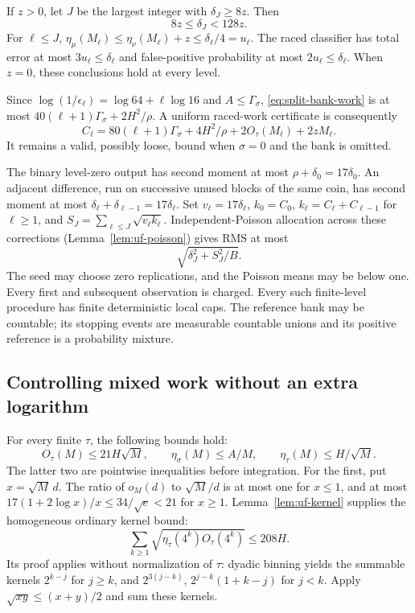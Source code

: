 If $z>0$, let $J$ be the largest integer with $\delta_J\ge8z$.
Then
\begin{equation}\label{eq:split-terminal-level}
 8z\le\delta_J<128z.
\end{equation}
For $\ell\le J$,
$\eta_\mu(M_\ell)\le\eta_\nu(M_\ell)+z\le\delta_\ell/4=u_\ell$.
The raced classifier has total error at most $3u_\ell\le\delta_\ell$
and false-positive probability at most $2u_\ell\le\delta_\ell$.
When $z=0$, these conclusions hold at every level.

Since $\log(1/\epsilon_\ell)=\log64+\ell\log16$ and
$A\le\Gamma_\sigma$, \eqref{eq:split-bank-work} is at most
$40(\ell+1)\Gamma_\sigma+2H^2/\rho$.
A uniform raced-work certificate is consequently
\begin{equation}\label{eq:split-level-work}
 C_\ell=80(\ell+1)\Gamma_\sigma+4H^2/\rho
                  +2O_\tau(M_\ell)+2zM_\ell.
\end{equation}
It remains a valid, possibly loose, bound when $\sigma=0$ and the bank is
omitted.

The binary level-zero output has second moment at most
$\rho+\delta_0=17\delta_0$. An adjacent difference, run on successive
unused blocks of the same coin, has second moment at most
$\delta_\ell+\delta_{\ell-1}=17\delta_\ell$.
Set $v_\ell=17\delta_\ell$, $k_0=C_0$,
$k_\ell=C_\ell+C_{\ell-1}$ for $\ell\ge1$, and
$S_J=\sum_{\ell\le J}\sqrt{v_\ell k_\ell}$.
Independent-Poisson allocation across these corrections
(Lemma~\ref{lem:uf-poisson})
gives RMS at most
\begin{equation}\label{eq:split-poisson}
 \sqrt{\delta_J^2+S_J^2/B}.
\end{equation}
The seed may choose zero replications, and the Poisson means may be
below one. Every first and subsequent observation is charged.
Every such finite-level procedure has finite deterministic local caps.
The reference bank may be countable; its stopping events are measurable
countable unions and its positive reference is a probability mixture.

\subsection{Controlling mixed work without an extra logarithm}

For every finite $\tau$, the following bounds hold:
\begin{equation}\label{eq:split-elementary-kernels}
 O_\tau(M)\le21H\sqrt M,\qquad
 \eta_\sigma(M)\le A/M,\qquad
 \eta_\tau(M)\le H/\sqrt M.
\end{equation}
The latter two are pointwise inequalities before integration.
For the first, put $x=\sqrt M\,d$. The ratio of $o_M(d)$ to
$\sqrt M/d$ is at most one for $x\le1$, and at most
$17(1+2\log x)/x\le34/\sqrt e<21$ for $x\ge1$.
Lemma~\ref{lem:uf-kernel} supplies the homogeneous ordinary kernel bound:
\begin{equation}\label{eq:split-ordinary-kernel}
 \sum_{k\ge1}\sqrt{\eta_\tau(4^k)O_\tau(4^k)}\le 208H.
\end{equation}
Its proof applies without normalization of $\tau$: dyadic binning yields
the summable kernels $2^{k-j}$ for $j\ge k$, and
$2^{3(j-k)}$, $2^{j-k}(1+k-j)$ for $j<k$.
Apply $\sqrt{xy}\le(x+y)/2$ and sum these kernels.

